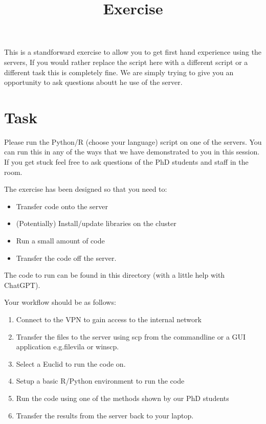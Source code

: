 \documentclass{article}
\begin{document}
\title{Exercise}
\maketitle

This is a standforward exercise to allow you to get first hand experience using the servers, If you would rather replace the script here with a different script or a different task this is completely fine. We are simply trying to give you an opportunity to ask questions aboutt he use of the server.


\section*{Task}

Please run the Python/R (choose your language) script on one of the servers.
You can run this in any of the ways that we have demonstrated to you in this
session. If you get stuck feel free to ask questions of the PhD students and
staff in the room. 


The exercise has been designed so that you need to:

\begin{itemize}
  \item Transfer code onto the server
  \item (Potentially) Install/update libraries on the cluster
  \item Run a small amount of code 
  \item Transfer the code off the server.
\end{itemize}
 
The code to run can be found in this directory (with a little help with ChatGPT). 

Your workflow should be as follows:

\begin{enumerate}
  \item Connect to the VPN to gain access to the internal network
  \item Transfer the files to the server using scp from the commandline or a GUI application e.g.filevila or winscp.
  \item Select a Euclid to run the code on.
  \item Setup a basic R/Python environment to run the code 
  \item Run the code using one of the methods shown by our PhD students
  \item Transfer the results from the server back to your laptop. 
\end{enumerate}
\end{document}
